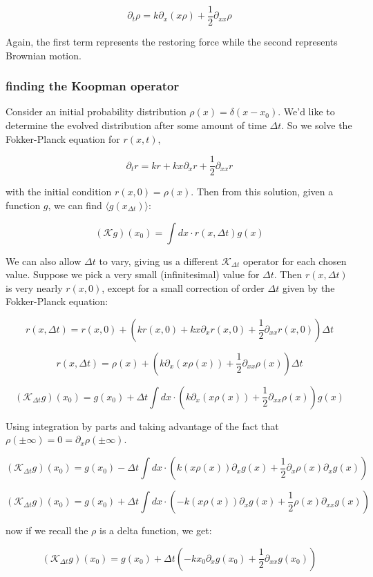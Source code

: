 \documentclass[]{article}
\newcommand{\p}[1]{\left( #1 \right)}
\newcommand{\Kp}{\mathcal{K}}
\begin{document}
$$
\partial_t \rho = k \partial_x \p{x \rho} + \frac{1}{2} \partial_{xx} \rho
$$

Again, the first term represents the restoring force while the second represents Brownian motion.

\subsubsection{finding the Koopman operator}

Consider an initial probability distribution $\rho(x) = \delta(x-x_0)$. We'd like to determine the evolved distribution after some amount of time $\Delta t$. So we solve the Fokker-Planck equation for $r(x, t)$,

$$
\partial_t r = k r + kx \partial_x r + \frac{1}{2} \partial_{xx} r
$$

with the initial condition $r(x, 0) = \rho(x)$. Then from this solution, given a function $g$, we can find $\langle g(x_{\Delta t}) \rangle$:

$$
(\Kp g)(x_0) = \int dx \cdot r(x, \Delta t) g(x)
$$

We can also allow $\Delta t$ to vary, giving us a different $\Kp_{\Delta t}$ operator for each chosen value. Suppose we pick a very small (infinitesimal) value for $\Delta t$. Then $r(x, \Delta t)$ is very nearly $r(x, 0)$, except for a small correction of order $\Delta t$ given by the Fokker-Planck equation:

$$
r(x, \Delta t) = r(x, 0) + \p{kr(x, 0) + kx\partial_x r(x, 0) + \frac{1}{2}\partial_{xx}r(x, 0)}\Delta t
$$

$$
r(x, \Delta t) = \rho(x) + \p{k\partial_x\p{x\rho(x)}
+ \frac{1}{2}\partial_{xx}\rho(x)}\Delta t
$$

$$
(\Kp_{\Delta t} g)(x_0) = g(x_0) +
\Delta t \int dx \cdot
\p{k\partial_x\p{x\rho(x)}
	+ \frac{1}{2}\partial_{xx}\rho(x)}
g(x)
$$

Using integration by parts and taking advantage of the fact that $\rho(\pm\infty) = 0 =\partial_x \rho(\pm\infty)$.

$$
(\Kp_{\Delta t} g)(x_0) = g(x_0) -
\Delta t \int dx \cdot
\p{k\p{x\rho(x)} \partial_x g(x)
+ \frac{1}{2}\partial_{x}\rho(x)\partial_x g(x)}
$$

$$
(\Kp_{\Delta t} g)(x_0) = g(x_0) +
\Delta t \int dx \cdot
\p{-k\p{x\rho(x)} \partial_x g(x)
	+ \frac{1}{2}\rho(x)\partial_{xx} g(x)}
$$

now if we recall the $\rho$ is a delta function, we get:

$$
(\Kp_{\Delta t} g)(x_0) = g(x_0) +
\Delta t \p{-kx_0 \partial_x g(x_0)
	+ \frac{1}{2}\partial_{xx} g(x_0)}
$$
\end{document}
